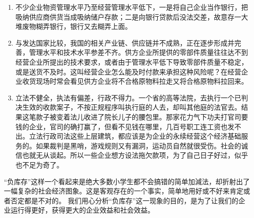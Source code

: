     \begin{enumerate}
        \item  不少企业物资管理水平乃至经营管理水平低下，一是将自己企业当作银行，把吸纳供应商供货当成吸纳储户存款；二是向银行贷款后没法交差，故意存一大堆废物糊弄银行，银行又去糊弄上面。

        \item  与发达国家比较，我国的相关产业链、供应链并不成熟，正在逐步形成并完善，管理水平和技术水平参差不齐。供方企业所提供的零部件质量往往达不到经营企业所提出的技术要求，或者由于管理水平低下导致零部件质量不稳定，或是送货不及时。这叫经营企业怎么能及时付款来承担这种风险呢？在经营企业收货现场时常会看见供方企业将不合格原物料拉走又将合格原物料拉回来。

        \item  立法不健全，执法有偏差，行政不得力。一个省的高等法院，去执行一个已判决生效的收款案子，不按正规程序叫执行庭的人去，却叫其他庭的法官去。结果这笔款子被变着法儿收进了院长儿子的腰包里。那家花力气下功夫打官司要钱的企业，官司的确打赢了，但看不见钱在哪里，几百号职工连工资也发不出。立法行政司法这些上层建筑，都应该是为企业的永续经营这个经济基础服务的。如果裁判是黑哨，游戏规则又有漏洞，运动员自然就很受伤。社会的诚信也就无从谈起。所以一些企业想方设法拖欠款项，为了自己日子好过，似乎也不足为奇了。
    \end{enumerate}

    “负库存”这样一个看起来是绝大多数小学生都不会搞错的简单加減法，却折射出了一幅复杂的社会经济图象。这是客观存在的一个事实，简单地用好或不好来肯定或者否定都是不对的。 我们用心分析“负库存”这一现象的目的，是为了让我们的企业运行得更好，获得更大的企业效益和社会效益。
